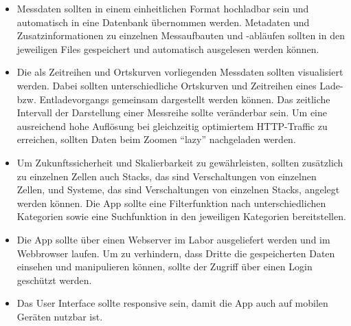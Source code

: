 \begin{itemize}

\item Messdaten sollten in einem einheitlichen Format hochladbar sein und automatisch in eine Datenbank übernommen werden. Metadaten und Zusatzinformationen zu einzelnen Messaufbauten und -abläufen sollten in den jeweiligen Files gespeichert und automatisch ausgelesen werden können.

\item Die als Zeitreihen und Ortskurven vorliegenden Messdaten sollten visualisiert werden. Dabei sollten unterschiedliche Ortskurven und Zeitreihen eines Lade- bzw. Entladevorgangs gemeinsam dargestellt werden können. Das zeitliche Intervall der Darstellung einer Messreihe sollte veränderbar sein. Um eine ausreichend hohe Auflösung bei gleichzeitig optimiertem HTTP-Traffic zu erreichen, sollten Daten beim Zoomen ``lazy'' nachgeladen werden.

\item Um Zukunftssicherheit und Skalierbarkeit zu gewährleisten, sollten zusätzlich zu einzelnen Zellen auch Stacks, das sind Verschaltungen von einzelnen Zellen, und Systeme, das sind Verschaltungen von einzelnen Stacks, angelegt werden können. Die App sollte eine Filterfunktion nach unterschiedlichen Kategorien sowie eine Suchfunktion in den jeweiligen Kategorien bereitstellen.

\item Die App sollte über einen Webserver im Labor ausgeliefert werden und im Webbrowser laufen. Um zu verhindern, dass Dritte die gespeicherten Daten einsehen und manipulieren können, sollte der Zugriff über einen Login geschützt werden.

\item Das User Interface sollte responsive sein, damit die App auch auf mobilen Geräten nutzbar ist.

\end{itemize}
